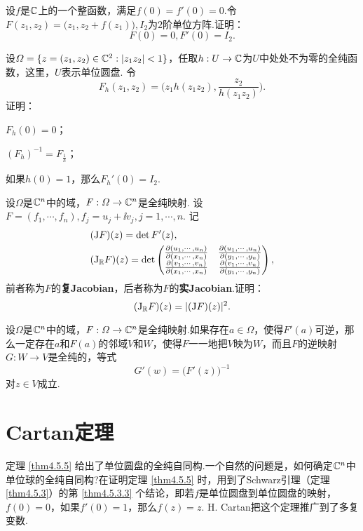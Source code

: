 \begin{xiti}\hypertarget{xiti9.4}{}
  \item \hypertarget{xiti9.4.1}{} 设$f$是$\mathbb C$上的一个整函数，满足$f(0)=f'(0)=0$.令$F(z_1,z_2)=\big(z_1,z_2+f(z_1)\big), I_2$为$2$阶单位方阵.证明：
      \[
        F(0) = 0,F'(0) = I_2.
       \]
  \item \hypertarget{xiti9.4.2}{} 设$\varOmega=\{z=(z_1,z_2)\in\mathbb C^2:|z_1z_2|<1\}$，任取$h:U\to\mathbb C$为$U$中处处不为零的全纯函数，这里，$U$表示单位圆盘. 令
      \[
        F_h(z_1,z_2) = \bigg(z_1h(z_1z_2),\frac{z_2}{h(z_1z_2)}\bigg).
      \]
      证明：
      \begin{enuma}
        \item $F_h(0)=0$；
        \item $(F_h)^{-1}=F_{\frac1h}$；
        \item 如果$h(0)=1$，那么$F_h'(0)= I_2$.
      \end{enuma}
  \item 设$\Omega$是$\mathbb C^n$中的域，$F:\varOmega\to\mathbb C^n$是全纯映射. 设$F=(f_1,\cdots,f_n),f_j=u_j+\ii v_j,j=1,\cdots,n$. 记
      \begin{align*}
        & (\mathrm JF)(z)=\det F'(z),\\
        &(\mathrm J_\mathbb R F)(z)=\det\begin{pmatrix}
        \frac{\partial (u_1,\cdots,u_n)}{\partial (x_1,\cdots,x_n)}&\frac{\partial (u_1,\cdots,u_n)}{\partial (y_1,\cdots,y_n)}\\
        \frac{\partial (v_1,\cdots,v_n)}{\partial (x_1,\cdots,x_n)}&\frac{\partial (v_1,\cdots,v_n)}{\partial (y_1,\cdots,y_n)}
      \end{pmatrix},
    \end{align*}
    前者称为$F$的\textbf{复Jacobian}，后者称为$F$的\textbf{实Jacobian}.证明：
    \[
      (\mathrm J_\mathbb R F)(z) = |(\mathrm JF)(z)|^2.
    \]
  \item 设$\Omega$是$\mathbb C^n$中的域，$F:\varOmega\to \mathbb C^n$是全纯映射.如果存在$a\in\Omega$，使得$F'(a)$可逆，那么一定存在$a$和$F(a)$的邻域$V$和$W$，使得$F$一一地把$V$映为$W$，而且$F$的逆映射$G:W\to V$是全纯的，等式
    \[
      G'(w) = \big(F'(z)\big)^{-1}
    \]
    对$z\in V$成立.
\end{xiti}

\section{Cartan定理\label{sec9.5}}
定理 \ref{thm4.5.5} 给出了单位圆盘的全纯自同构.一个自然的问题是，如何确定$\mathbb C^n$中单位球的全纯自同构?在证明定理 \ref{thm4.5.5} 时，用到了Schwarz引理（定理 \ref{thm4.5.3}）的第 \ref{thm4.5.3.3} 个结论，即若$f$是单位圆盘到单位圆盘的映射，$f(0)=0$，如果$f'(0)=1$，那么$f(z)=z$. H. Cartan把这个定理推广到了多复变数.

